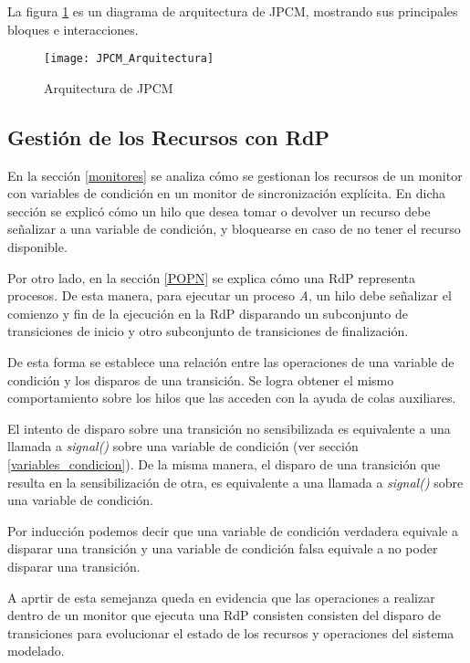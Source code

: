 La figura \ref{fig:JPCM_Arquitectura} es un diagrama de arquitectura de JPCM,
mostrando sus principales bloques e interacciones.

\begin{figure}[H]
  \centering
  \texttt{[image: JPCM\_Arquitectura]}
  \caption{Arquitectura de JPCM}
  \label{fig:JPCM_Arquitectura}
\end{figure}

\subsection{Gestión de los Recursos con RdP}
\label{JPCM_gestion_rec_rdp}
En la sección \ref{monitores} se analiza cómo se gestionan los recursos de un
monitor con variables de condición en un monitor de sincronización explícita.
En dicha sección se explicó cómo un hilo que desea tomar o devolver un recurso
debe señalizar a una variable de condición, y bloquearse en caso de no tener el
recurso disponible.

Por otro lado, en la sección \ref{POPN} se explica cómo una RdP representa
procesos. De esta manera, para ejecutar un proceso \textit{A}, un hilo debe
señalizar el comienzo y fin de la ejecución en la RdP disparando un subconjunto
de transiciones de inicio y otro subconjunto de transiciones de finalización.
 
De esta forma se establece una relación entre las operaciones de una variable de
condición y los disparos de una transición. Se logra obtener el mismo
comportamiento sobre los hilos que las acceden con la ayuda de colas auxiliares. 

El intento de disparo sobre una transición no sensibilizada es equivalente a una
llamada a \textit{signal()} sobre una variable de condición (ver sección
\ref{variables_condicion}).
De la misma manera, el disparo de una transición que resulta en la
sensibilización de otra, es equivalente a una llamada a \textit{signal()} sobre
una variable de condición.

Por inducción podemos decir que una variable de condición verdadera equivale a
disparar una transición y una variable de condición falsa equivale a no poder
disparar una transición.

A aprtir de esta semejanza queda en evidencia que las operaciones a realizar
dentro de un monitor que ejecuta una RdP consisten consisten del disparo de
transiciones para evolucionar el estado de los recursos y operaciones del
sistema modelado.

